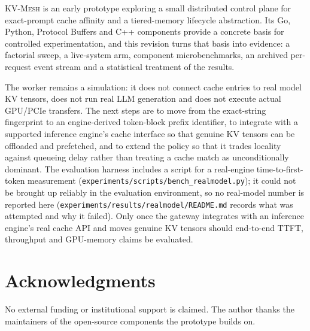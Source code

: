 \documentclass[10pt,twocolumn]{article}
\newcommand{\kvmesh}{\textsc{KV-Mesh}}
\begin{document}
\kvmesh{} is an early prototype exploring a small distributed control plane
for exact-prompt cache affinity and a tiered-memory lifecycle abstraction.
Its Go, Python, Protocol Buffers and C++ components provide a concrete basis
for controlled experimentation, and this revision turns that basis into
evidence: a factorial sweep, a live-system arm, component microbenchmarks, an
archived per-request event stream and a statistical treatment of the results.

The worker remains a simulation: it does not connect cache entries to real
model KV tensors, does not run real LLM generation and does not execute actual
GPU/PCIe transfers. The next steps are to move from the exact-string
fingerprint to an engine-derived token-block prefix identifier, to integrate
with a supported inference engine's cache interface so that genuine KV tensors
can be offloaded and prefetched, and to extend the policy so that it trades
locality against queueing delay rather than treating a cache match as
unconditionally dominant. The evaluation harness includes a script for a
real-engine time-to-first-token measurement
(\texttt{experiments/scripts/bench\_realmodel.py}); it could not be brought
up reliably in the evaluation environment, so no real-model number is
reported here
(\texttt{experiments/results/realmodel/README.md} records what was attempted
and why it failed). Only once the gateway integrates with an inference
engine's real cache API and moves genuine KV tensors should end-to-end TTFT,
throughput and GPU-memory claims be evaluated.

\section*{Acknowledgments}

No external funding or institutional support is claimed. The author thanks
the maintainers of the open-source components the prototype builds on.
\end{document}
